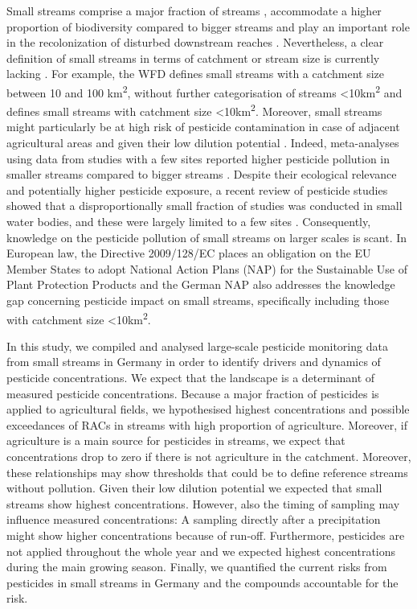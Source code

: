 \documentclass[journal=esthag,manuscript=article]{achemso}
\begin{document}
Small streams comprise a major fraction of streams \citep{nadeau_hydrological_2007}, accommodate a higher proportion of biodiversity compared to bigger streams \citep{davies_comparison_2008, biggs_report_2014} and play an important role in the recolonization of disturbed downstream reaches \citep{liess_analyzing_2005, orlinskiy_forested_2015}.
Nevertheless, a clear definition of small streams in terms of catchment or stream size is currently lacking \citep{lorenz_specifics_2016}. 
For example, the WFD defines small streams with a catchment size between 10 and 100 km\textsuperscript{2}, without further categorisation of streams \textless 10km\textsuperscript{2} and \citet{lorenz_specifics_2016} defines small streams with catchment size \textless 10km\textsuperscript{2}. 
Moreover, small streams might particularly be at high risk of pesticide contamination in case of adjacent agricultural areas and given their low dilution potential \citep{schulz_field_2004,liess_determination_1999}.
Indeed, meta-analyses using data from studies with a few sites reported higher pesticide pollution in smaller streams compared to bigger streams \citep{stehle_pesticide_2015,schulz_field_2004}. 
Despite their ecological relevance and potentially higher pesticide exposure, a recent review of pesticide studies showed that a disproportionally small fraction of studies was conducted in small water bodies, and these were largely limited to a few sites \citep{lorenz_specifics_2016}. 
Consequently, knowledge on the pesticide pollution of small streams on larger scales is scant. 
In European law, the Directive 2009/128/EC \citep{European_Union_2009} places an obligation on the EU Member States to adopt National Action Plans (NAP) for the Sustainable Use of Plant Protection Products and the German NAP also addresses the knowledge gap concerning pesticide impact on small streams, specifically including those with catchment size \textless 10km\textsuperscript{2}.

In this study, we compiled and analysed large-scale pesticide monitoring data from small streams in Germany in order to identify drivers and dynamics of pesticide concentrations.
We expect that the landscape is a determinant of measured pesticide concentrations.
Because a major fraction of pesticides is applied to agricultural fields, we hypothesised highest concentrations and possible exceedances of RACs in streams with high proportion of agriculture. 
Moreover, if agriculture is a main source for pesticides in streams, we expect that concentrations drop to zero if there is not agriculture in the catchment. 
Moreover, these relationships may show thresholds that could be to define reference streams without pollution.
Given their low dilution potential we expected that small streams show highest concentrations. 
However, also the timing of sampling may influence measured concentrations:
A sampling directly after a precipitation might show higher concentrations because of run-off.
Furthermore, pesticides are not applied throughout the whole year and we expected highest concentrations during the main growing season.
Finally, we quantified the current risks from pesticides in small streams in Germany and the compounds accountable for the risk.
\end{document}
